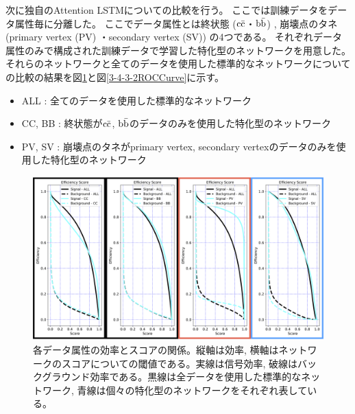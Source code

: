 次に独自のAttention LSTMについての比較を行う。
ここでは訓練データをデータ属性毎に分離した。
ここでデータ属性とは終状態 ($\rm c\bar{c}$・$\rm b\bar{b}$) , 崩壊点のタネ (primary vertex (PV) ・secondary vertex (SV)) の4つである。
それぞれデータ属性のみで構成された訓練データで学習した特化型のネットワークを用意した。
それらのネットワークと全てのデータを使用した標準的なネットワークについての比較の結果を図\ref{3-4-3-2EfficiencyCurve}と図\ref{3-4-3-2ROCCurve}に示す。

\begin{itemize}
 \item ALL : 全てのデータを使用した標準的なネットワーク
 \item CC, BB : 終状態が$\rm c\bar{c}$, $\rm b\bar{b}$のデータのみを使用した特化型のネットワーク
 \item PV, SV : 崩壊点のタネがprimary vertex, secondary vertexのデータのみを使用した特化型のネットワーク
\end{itemize}

\begin{figure}[htbp]
 \centering
 \includegraphics[width=1.0\textwidth, clip]{Figure/3Networks/3-4-3-2EfficiencyCurve.png}
 \caption[各データ属性の効率とスコアの関係]{各データ属性の効率とスコアの関係。縦軸は効率, 横軸はネットワークのスコアについての閾値である。実線は信号効率, 破線はバックグラウンド効率である。黒線は全データを使用した標準的なネットワーク, 青線は個々の特化型のネットワークをそれぞれ表している。}
 \label{3-4-3-2EfficiencyCurve}
\end{figure}

